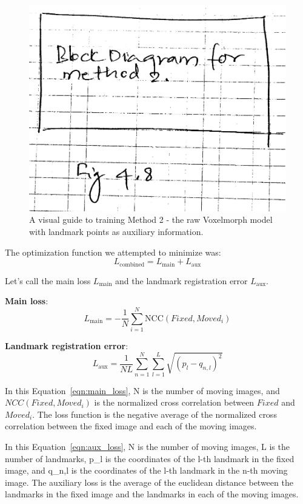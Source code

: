 \documentclass{report}
\begin{document}
	\begin{figure}[h!]
		\centering
		\includegraphics[width=0.6\columnwidth]{resources/chapter4/block_diagram_method_2.png}
		\caption{A visual guide to training Method 2 - the raw Voxelmorph model with landmark points as auxiliary information.}
		\label{fig:block_method2}
	\end{figure}
	
	The optimization function we attempted to minimize was:
	\begin{equation}
	L_\text{combined} = L_\text{main} + L_\text{aux} \label{eqn:combined_loss}
	\end{equation}	
	
	Let's call the main loss $L_\text{main}$ and the landmark registration error $L_\text{aux}$.
	
	\textbf{Main loss}:
	\begin{equation}
	L_\text{main} = -\frac{1}{N} \sum_{i=1}^N \text{NCC}(Fixed, Moved_i) \label{eqn:main_loss}
	\end{equation}
	
	\textbf{Landmark registration error}:
	\begin{equation}
		L_\text{aux} = \frac{1}{NL} \sum_{n=1}^N \sum_{l=1}^L \sqrt{(p_l - q_{n,l})^2}
		\label{eqn:aux_loss}
	\end{equation}
	
	In this Equation~\ref{eqn:main_loss}, N is the number of moving images, and $NCC(Fixed, Moved_i)$ is the normalized cross correlation between $Fixed$ and $Moved_i$. The loss function is the negative average of the normalized cross correlation between the fixed image and each of the moving images.
	
	In this Equation~\ref{eqn:aux_loss}, N is the number of moving images, L is the number of landmarks, p\_l is the coordinates of the l-th landmark in the fixed image, and q\_{n,l} is the coordinates of the l-th landmark in the n-th moving image. The auxiliary loss is the average of the euclidean distance between the landmarks in the fixed image and the landmarks in each of the moving images.
	
\end{document}
